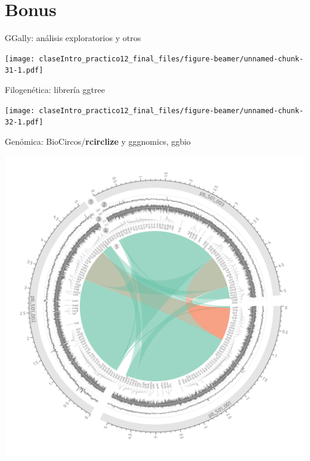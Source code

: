 \documentclass[ignorenonframetext,]{beamer}
\begin{document}
\hypertarget{bonus}{%
\section{Bonus}\label{bonus}}

\begin{frame}{GGally: análisis exploratorios y otros}
\protect\hypertarget{ggally-anuxe1lisis-exploratorios-y-otros}{}

\small

\texttt{[image: claseIntro\_practico12\_final\_files/figure-beamer/unnamed-chunk-31-1.pdf]}

\normalsize

\end{frame}

\begin{frame}{Filogenética: librería ggtree}
\protect\hypertarget{filogenuxe9tica-libreruxeda-ggtree}{}

\small

\texttt{[image: claseIntro\_practico12\_final\_files/figure-beamer/unnamed-chunk-32-1.pdf]}

\normalsize

\end{frame}

\begin{frame}{Genómica: BioCircos/\textbf{rcirclize} y gggnomics, ggbio}
\protect\hypertarget{genuxf3mica-biocircosrcirclize-y-gggnomics-ggbio}{}

\begin{center}\includegraphics[width=0.95\linewidth]{rcirclize} \end{center}

\end{frame}
\end{document}
